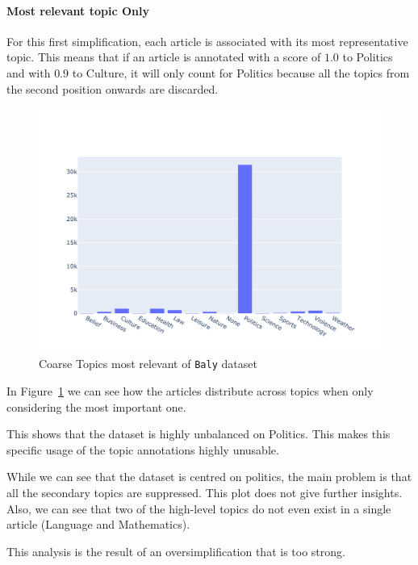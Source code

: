 \paragraph{Most relevant topic Only}

For this first simplification, each article is associated with its most representative topic. This means that if an article is annotated with a score of $1.0$ to Politics and with $0.9$ to Culture, it will only count for Politics because all the topics from the second position onwards are discarded.


\begin{figure}[!htbp]
    \centering
    \includegraphics[width=\linewidth]{figures/baly_coarse_first.pdf}
    \caption{Coarse Topics most relevant of \texttt{Baly} dataset}
    \label{fig:baly_coarse_first}
\end{figure}

In Figure~\ref{fig:baly_coarse_first} we can see how the articles distribute across topics when only considering the most important one.

This shows that the dataset is highly unbalanced on Politics. This makes this specific usage of the topic annotations highly unusable.

While we can see that the dataset is centred on politics, the main problem is that all the secondary topics are suppressed.
This plot does not give further insights.
Also, we can see that two of the high-level topics do not even exist in a single article (Language and Mathematics).

This analysis is the result of an oversimplification that is too strong.

